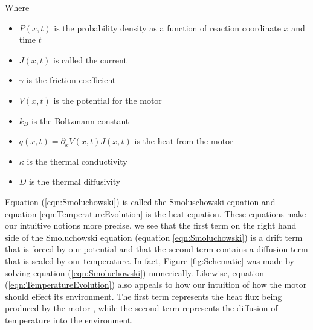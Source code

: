 Where
\begin{itemize}
\item{$P(x, t)$ is the probability density as a function of  reaction coordinate $x$ and time $t$}
\item{$J(x, t)$ is called the current}
\item{$\gamma$ is the friction coefficient}
\item{$V(x, t)$ is the potential for the motor}
\item{$k_B$ is the Boltzmann constant}
\item{$q(x, t) = \partial_x V(x, t) J(x, t)$ is the heat from the motor}
\item{$\kappa$ is the thermal conductivity}
\item{$D$ is the thermal diffusivity}
\end{itemize}

Equation (\ref{eqn:Smoluchowski}) is called the Smoluschowski equation \cite{KellerBustamante2000} and equation \ref{eqn:TemperatureEvolution} is the heat equation. These equations make our intuitive notions more precise, we see that the first term on the right hand side of the Smoluchowski equation (equation \ref{eqn:Smoluchowski}) is a drift term that is forced by our potential and that the second term contains a diffusion term that is scaled by our temperature. In fact, Figure \ref{fig:Schematic} was made by solving equation (\ref{eqn:Smoluchowski}) numerically. Likewise, equation (\ref{eqn:TemperatureEvolution}) also appeals to how our intuition of how the motor should effect its environment. The first term represents the heat flux being produced by the motor \cite{M.W.Jack2016}, while the second term represents the diffusion of temperature into the environment.
